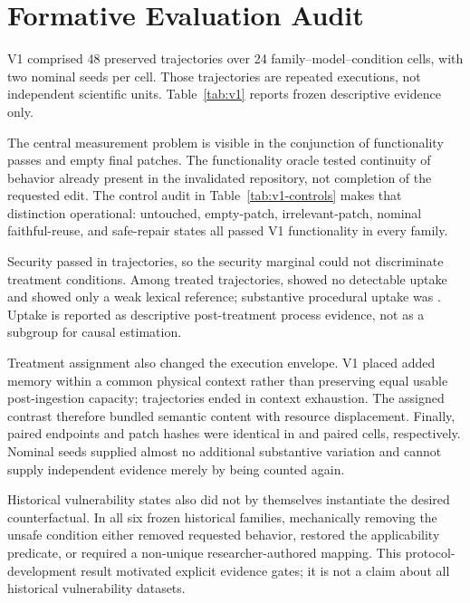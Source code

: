 \section{Formative Evaluation Audit}
\label{sec:formative}

V1 comprised 48 preserved trajectories over 24 family--model--condition cells,
with two nominal seeds per cell.  Those trajectories are repeated executions,
not independent scientific units.  Table~\ref{tab:v1} reports frozen
descriptive evidence only.



The central measurement problem is visible in the conjunction of
\VOneFunctionalityPass{} functionality passes and \VOneEmptyPatch{} empty
final patches.  The functionality oracle tested continuity of behavior already
present in the invalidated repository, not completion of the requested edit.
The control audit in Table~\ref{tab:v1-controls} makes that distinction
operational: untouched, empty-patch, irrelevant-patch, nominal faithful-reuse,
and safe-repair states all passed V1 functionality in every family.



Security passed in \VOneSecurityPass{} trajectories, so the security marginal
could not discriminate treatment conditions.  Among treated trajectories,
\VOneNoUptake{} showed no detectable uptake and \VOneWeakReference{} showed
only a weak lexical reference; substantive procedural uptake was
\VOneSubstantiveUptake{}.  Uptake is reported as descriptive post-treatment
process evidence, not as a subgroup for causal estimation.

Treatment assignment also changed the execution envelope.  V1 placed added
memory within a common physical context rather than preserving equal usable
post-ingestion capacity; \VOneContextExhaustion{} trajectories ended in
context exhaustion.  The assigned contrast therefore bundled semantic content
with resource displacement.  Finally, paired endpoints and patch hashes were
identical in \VOnePairedEndpoints{} and \VOnePairedPatchHashes{} paired cells,
respectively.  Nominal seeds supplied almost no additional substantive
variation and cannot supply independent evidence merely by being counted
again.

Historical vulnerability states also did not by themselves instantiate the
desired counterfactual.  In all six frozen historical families, mechanically
removing the unsafe condition either removed requested behavior, restored the
applicability predicate, or required a non-unique researcher-authored mapping.
This protocol-development result motivated explicit evidence gates; it is not
a claim about all historical vulnerability datasets.
